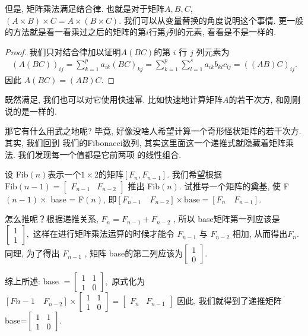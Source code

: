 但是, 矩阵乘法满足结合律. 也就是对于矩阵$A,B,C$, 
$(A\times B)\times C=A\times (B\times C)$. 我们可以从变量替换的角度说明这个事情. 
更一般的方法就是看一看乘过之后的矩阵的第$i$行第$j$列的元素, 看看是不是一样的.
\begin{proof}
    我们只对结合律加以证明$A(BC)$的第 $i$ 行 $j$ 列元素为
    $$
    \begin{aligned}(A(BC))_{ij}=\sum_{k=1}^pa_{ik}(BC)_{kj}=\sum_{k=1}^p\sum_{l=1}^sa_{ik}b_{kl}c_{lj}=((AB)C)_{ij}.\end{aligned}
    $$
    因此 $A(BC) = (AB)C$.
\end{proof}

既然满足, 我们也可以对它使用快速幂. 比如快速地计算矩阵$A$的若干次方, 和刚刚说的是一样的. 

那它有什么用武之地呢? 毕竟, 好像没啥人希望计算一个奇形怪状矩阵的若干次方. 其实, 我们回到
我们的Fibonacci数列, 其实这里面这一个递推式就隐藏着矩阵乘法. 我们发现每一个值都是它前两项
的线性组合. 

设 Fib$(n)$表示一个$1\times 2$的矩阵$[F_n, F_{n-1}]$. 我们希望根据
 $\text{Fib}(n-1)=\left[\begin{array}{cc}F_{n-1}&F_{n-2}\end{array}\right]$
 推出 Fib$(n)$. 
试推导一个矩阵的奠基, 使 F$(n -1)\times $ base = F$(n)$, 即$[F_{n-1}\quad F_{n-2}]\times\mathrm{base}=[F_{n}\quad F_{n-1}]$. 

怎么推呢？根据递推关系, $F_n=F_{n-1}+F_{n-2}$ , 
所以 base矩阵第一列应该是$\left[\begin{array}{c}1\\1\end{array}\right],$
这样在进行矩阵乘法运算的时候才能令 $F_{n-1}$ 与 $F_{n-2}$ 相加, 从而得出$F_n$. 同理, 为了得出 $F_{n-1}$ , 矩阵 base的第二列应该为$\left[\begin{array}{c}1\\0\end{array}\right]$. 

综上所述: base $=\left[\begin{array}{cc}1&1\\1&0\end{array}\right],$ 原式化为$[F{n-1}
\quad F_{n-2}]\times\left[\begin{array}{cc}1&1\\1&0\end{array}\right]
=\left[\begin{array}{cc}F_n&F_{n-1}\end{array}\right]$ 因此, 我们就得到了递推矩阵
base=$\left[\begin{array}{cc}1&1\\1&0\end{array}\right]$. 

